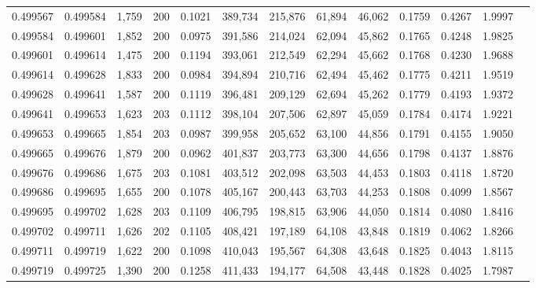 \begin{tabular}{rrrrrrrrrrrrr}
0.499567 & 0.499584 & 1,759 & 200 &                                     0.1021 & 389,734 & 215,876 &  61,894 &  46,062 & 0.1759 & 0.4267 & 1.9997 \\
0.499584 & 0.499601 & 1,852 & 200 &                                     0.0975 & 391,586 & 214,024 &  62,094 &  45,862 & 0.1765 & 0.4248 & 1.9825 \\
0.499601 & 0.499614 & 1,475 & 200 &                                     0.1194 & 393,061 & 212,549 &  62,294 &  45,662 & 0.1768 & 0.4230 & 1.9688 \\
0.499614 & 0.499628 & 1,833 & 200 &                                     0.0984 & 394,894 & 210,716 &  62,494 &  45,462 & 0.1775 & 0.4211 & 1.9519 \\
0.499628 & 0.499641 & 1,587 & 200 &                                     0.1119 & 396,481 & 209,129 &  62,694 &  45,262 & 0.1779 & 0.4193 & 1.9372 \\
0.499641 & 0.499653 & 1,623 & 203 &                                     0.1112 & 398,104 & 207,506 &  62,897 &  45,059 & 0.1784 & 0.4174 & 1.9221 \\
0.499653 & 0.499665 & 1,854 & 203 &                                     0.0987 & 399,958 & 205,652 &  63,100 &  44,856 & 0.1791 & 0.4155 & 1.9050 \\
0.499665 & 0.499676 & 1,879 & 200 &                                     0.0962 & 401,837 & 203,773 &  63,300 &  44,656 & 0.1798 & 0.4137 & 1.8876 \\
0.499676 & 0.499686 & 1,675 & 203 &                                     0.1081 & 403,512 & 202,098 &  63,503 &  44,453 & 0.1803 & 0.4118 & 1.8720 \\
0.499686 & 0.499695 & 1,655 & 200 &                                     0.1078 & 405,167 & 200,443 &  63,703 &  44,253 & 0.1808 & 0.4099 & 1.8567 \\
0.499695 & 0.499702 & 1,628 & 203 &                                     0.1109 & 406,795 & 198,815 &  63,906 &  44,050 & 0.1814 & 0.4080 & 1.8416 \\
0.499702 & 0.499711 & 1,626 & 202 &                                     0.1105 & 408,421 & 197,189 &  64,108 &  43,848 & 0.1819 & 0.4062 & 1.8266 \\
0.499711 & 0.499719 & 1,622 & 200 &                                     0.1098 & 410,043 & 195,567 &  64,308 &  43,648 & 0.1825 & 0.4043 & 1.8115 \\
0.499719 & 0.499725 & 1,390 & 200 &                                     0.1258 & 411,433 & 194,177 &  64,508 &  43,448 & 0.1828 & 0.4025 & 1.7987 \\

\end{tabular}
